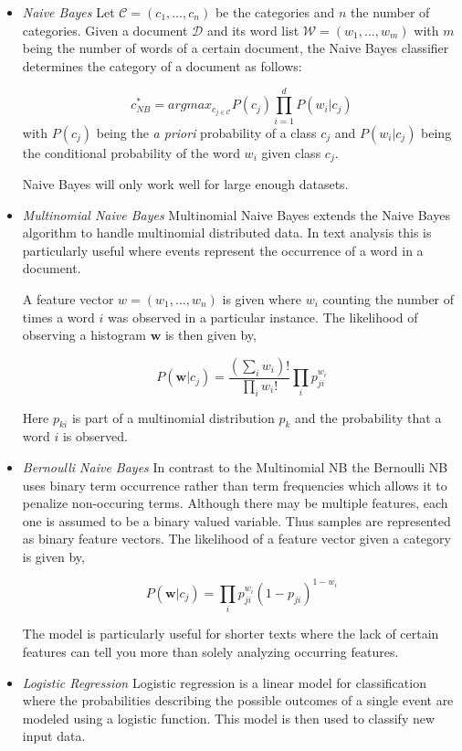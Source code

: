 \documentclass[a4paper,12pt]{article}
\begin{document}
\begin{itemize}
\item \textit{Naive Bayes} Let $\mathcal{C} = (c_1,\dots,c_n)$ be the categories and $n$ the number of categories. Given a document $\mathcal{D}$ and its word list $\mathcal{W} = (w_1, \dots, w_m)$ with $m$ being the number of words of a certain document, the Naive Bayes classifier determines the category of a document as follows:

$$
c^*_{NB} = argmax_{c_{j \in \mathcal{C}}} P(c_j) \prod^d_{i = 1} P(w_i | c_j)
$$
with $P(c_j)$ being the \textit{a priori} probability of a class $c_j$ and $P(w_i | c_j)$ being the conditional probability of the word $w_i$ given class $c_j$.

Naive Bayes will only work well for large enough datasets. 

\item \textit{Multinomial Naive Bayes}
Multinomial Naive Bayes extends the Naive Bayes algorithm to handle multinomial distributed data. In text analysis this is particularly useful where events represent the occurrence of a word in a document. 

A feature vector $w = (w_1, \dots, w_n)$ is given where $w_i$ counting the number of times a word $i$ was observed in a particular instance. The likelihood of observing a histogram $\mathbf{w}$ is then given by,

$$
 P(\mathbf{w}| c_j) = \frac{(\sum_{i}{w_i})!}{\prod_{i} w_i!}\prod_{i}p^{w_i}_{ji}
$$

Here $p_{ki}$ is part of a multinomial distribution $p_{k}$ and the probability that a word $i$ is observed.

\item \textit{Bernoulli Naive Bayes}
In contrast to the Multinomial NB the Bernoulli NB uses binary term occurrence rather than term frequencies which allows it to penalize non-occuring terms. Although there may be multiple features, each one is assumed to be a binary valued variable. Thus samples are represented as binary feature vectors. The likelihood of a feature vector given a category is given by,

$$
 P(\mathbf{w}| c_j) =\prod_{i} p^{w_i}_{ji}(1-p_{ji})^{1-w_i}
$$


The model is particularly useful for shorter texts where the lack of certain features can tell you more than solely analyzing occurring features. 

\item \textit{Logistic Regression}
Logistic regression is a linear model for classification where the probabilities describing the possible outcomes of a single event are modeled using a logistic function. This model is then used to classify new input data. 


\end{itemize}
\end{document}
